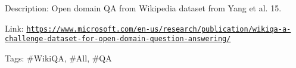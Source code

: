Description\+: Open domain QA from Wikipedia dataset from Yang et al. \textquotesingle{}15.

Link\+: \href{https://www.microsoft.com/en-us/research/publication/wikiqa-a-challenge-dataset-for-open-domain-question-answering/}{\tt https\+://www.\+microsoft.\+com/en-\/us/research/publication/wikiqa-\/a-\/challenge-\/dataset-\/for-\/open-\/domain-\/question-\/answering/}

Tags\+: \#\+Wiki\+QA, \#\+All, \#\+QA 
